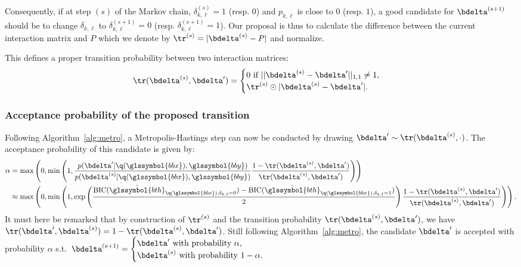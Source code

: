 Consequently, if at step $(s)$ of the Markov chain, $\delta_{k,\ell}^{(s)} = 1$ (resp. $0$) and $p_{k,\ell}$ is close to $0$ (resp. $1$), a good candidate for $\bdelta^{(s+1)}$ should be to change $\delta_{k,\ell}$ to $\delta_{k,\ell}^{(s+1)} = 0$ (resp. $\delta_{k,\ell}^{(s+1)} = 1$). Our proposal is thus to calculate the difference between the current interaction matrix and $P$ which we denote by $\tr^{(s)} = |\bdelta^{(s)} - P|$ and normalize.

This defines a proper transition probability between two interaction matrices:
\[ \tr(\bdelta^{(s)},\bdelta') = \begin{cases} 0 \text{ if } ||\bdelta^{(s)} - \bdelta'||_{1,1} \neq 1, \\ \tr^{(s)} \odot |\bdelta^{(s)} - \bdelta'|. \end{cases} \]

\subsubsection{Acceptance probability of the proposed transition}


Following Algorithm~\eqref{alg:metro}, a Metropolis-Hastings step can now be conducted by drawing $\bdelta' \sim \tr(\bdelta^{(s)},\cdot)$. The acceptance probability of this candidate is given by:
\begin{align*}
\alpha & = \max \left( 0, \min \left( 1, \frac{p(\bdelta' | \q(\glssymbol{bbx}), \glssymbol{bby})}{p(\bdelta^{(s)} | \q(\glssymbol{bbx}), \glssymbol{bby})} \frac{1-\tr(\bdelta^{(s)},\bdelta')}{\tr(\bdelta^{(s)},\bdelta')} \right) \right) \\
& \approx \max \left( 0, \min \left( 1, \exp \left( \frac{\text{BIC}(\hat{\glssymbol{bth}}_{\q(\glssymbol{bbx}),\delta_{k,\ell}=0}) - \text{BIC}(\hat{\glssymbol{bth}}_{\q(\glssymbol{bbx}),\delta_{k,\ell}=1})}{2} \right) \frac{1-\tr(\bdelta^{(s)},\bdelta')}{\tr(\bdelta^{(s)},\bdelta')} \right) \right).
\end{align*}
It must here be remarked that by construction of $\tr^{(s)}$ and the transition probability $\tr(\bdelta^{(s)},\bdelta')$, we have $\tr(\bdelta',\bdelta^{(s)}) = 1 - \tr(\bdelta^{(s)},\bdelta')$. Still following Algorithm~\eqref{alg:metro}, the candidate $\bdelta'$ is accepted with probability $\alpha$ s.t.\ $\bdelta^{(s+1)} = \begin{cases} \bdelta' \text{ with probability } \alpha, \\ \bdelta^{(s)} \text{ with probability } 1-\alpha. \end{cases}$

